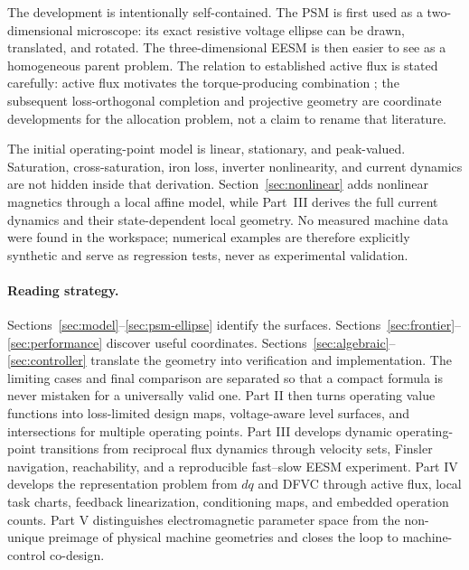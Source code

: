 The development is intentionally self-contained. The PSM is first used as a
two-dimensional microscope: its exact resistive voltage ellipse can be drawn,
translated, and rotated. The three-dimensional EESM is then easier to see as
a homogeneous parent problem. The relation to established active flux is
stated carefully: active flux motivates the torque-producing combination
\cite{boldea2008}; the subsequent loss-orthogonal completion and projective
geometry are coordinate developments for the allocation problem, not a claim
to rename that literature.

The initial operating-point model is linear, stationary, and peak-valued.
Saturation, cross-saturation, iron loss, inverter nonlinearity, and current
dynamics are not hidden inside that derivation. Section~\ref{sec:nonlinear}
adds nonlinear magnetics through a local affine model, while Part~III derives
the full current dynamics and their state-dependent local geometry. No
measured machine data were found
in the workspace; numerical examples are therefore explicitly synthetic and
serve as regression tests, never as experimental validation.

\paragraph{Reading strategy.}
Sections~\ref{sec:model}--\ref{sec:psm-ellipse} identify the surfaces.
Sections~\ref{sec:frontier}--\ref{sec:performance} discover useful
coordinates. Sections~\ref{sec:algebraic}--\ref{sec:controller} translate the
geometry into verification and implementation. The limiting cases and final
comparison are separated so that a compact formula is never mistaken for a
universally valid one. Part II then turns operating value functions into
loss-limited design maps, voltage-aware level surfaces, and intersections for
multiple operating points. Part III develops dynamic operating-point
transitions from reciprocal flux dynamics through velocity sets, Finsler
navigation, reachability, and a reproducible fast--slow EESM experiment.
Part IV develops the representation problem from \(dq\) and DFVC through
active flux, local task charts, feedback linearization, conditioning maps, and
embedded operation counts. Part V distinguishes electromagnetic parameter
space from the non-unique preimage of physical machine geometries and closes
the loop to machine-control co-design.
